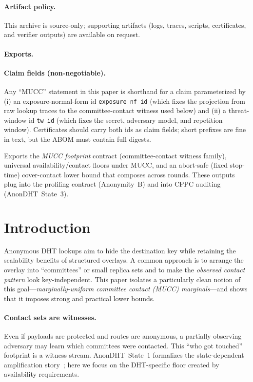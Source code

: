 \documentclass[11pt]{article}
\begin{document}
\paragraph{Artifact policy.}
This archive is source-only; supporting artifacts (logs, traces, scripts, certificates, and verifier outputs) are available on request.\cite{series:artifactpolicy}

\paragraph{Exports.}

\paragraph{Claim fields (non-negotiable).}
Any ``MUCC'' statement in this paper is shorthand for a claim parameterized by
(i) an exposure-normal-form id \texttt{exposure\_nf\_id} (which fixes the projection from raw lookup traces to the committee-contact witness used below) and
(ii) a threat-window id \texttt{tw\_id} (which fixes the secret, adversary model, and repetition window).
Certificates should carry both ids as claim fields; short prefixes are fine in text, but the ABOM must contain full digests.


Exports the \emph{MUCC footprint} contract (committee-contact witness family), universal availability/contact floors under MUCC, and an abort-safe (fixed stop-time) cover-contact lower bound that composes across rounds. These outputs plug into the profiling contract (Anonymity~B) and into CPPC auditing (AnonDHT~State~3).\cite{series:contractobjects,series:profiling,series:state3,series:abomoinl}

\section{Introduction}
Anonymous DHT lookups aim to hide the destination key while retaining the scalability benefits of structured overlays.
A common approach is to arrange the overlay into ``committees'' or small replica sets and to make the \emph{observed contact pattern} look key-independent.
This paper isolates a particularly clean notion of this goal---\emph{marginally-uniform committee contact (MUCC) marginals}---and shows that it imposes strong and practical lower bounds.

\paragraph{Contact sets are witnesses.}
Even if payloads are protected and routes are anonymous, a partially observing adversary may learn which committees were contacted.
This ``who got touched'' footprint is a witness stream.
AnonDHT~State~1 formalizes the state-dependent amplification story~\cite{series:state1}; here we focus on the DHT-specific floor created by availability requirements.
\end{document}
